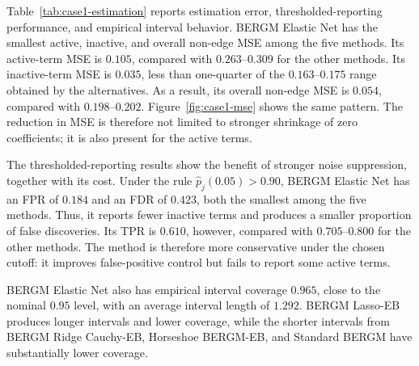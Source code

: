 \documentclass[preprint,12pt,authoryear]{elsarticle}
\begin{document}
Table~\ref{tab:case1-estimation} reports estimation error, thresholded-reporting
performance, and empirical interval behavior. BERGM Elastic Net has the
smallest active, inactive, and overall non-edge MSE among the five methods. Its
active-term MSE is \(0.105\), compared with \(0.263\)--\(0.309\) for the other
methods. Its inactive-term MSE is \(0.035\), less than one-quarter of the
\(0.163\)--\(0.175\) range obtained by the alternatives. As a result, its
overall non-edge MSE is \(0.054\), compared with \(0.198\)--\(0.202\).
Figure~\ref{fig:case1-mse} shows the same pattern. The reduction in MSE is
therefore not limited to stronger shrinkage of zero coefficients; it is also
present for the active terms.

The thresholded-reporting results show the benefit of stronger noise
suppression, together with its cost. Under the rule
\(\widehat p_j(0.05)>0.90\), BERGM Elastic Net has an FPR of \(0.184\) and an
FDR of \(0.423\), both the smallest among the five methods. Thus, it reports
fewer inactive terms and produces a smaller proportion of false discoveries.
Its TPR is \(0.610\), however, compared with \(0.705\)--\(0.800\) for the
other methods. The method is therefore more conservative under the chosen
cutoff: it improves false-positive control but fails to report some active
terms.

BERGM Elastic Net also has empirical interval coverage \(0.965\), close to the
nominal \(0.95\) level, with an average interval length of \(1.292\). BERGM
Lasso-EB produces longer intervals and lower coverage, while the shorter
intervals from BERGM Ridge Cauchy-EB, Horseshoe BERGM-EB, and Standard BERGM
have substantially lower coverage.
\end{document}
